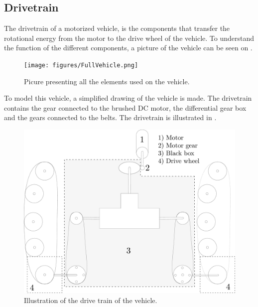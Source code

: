 \subsection{Drivetrain}
The drivetrain of a motorized vehicle, is the components that transfer the rotational energy from the motor to the drive wheel of the vehicle. To understand the function of the different components, a picture of the vehicle can be seen on . 

\begin{figure}[H]
	\centering
	\texttt{[image: figures/FullVehicle.png]}
	\caption{Picure presenting all the elements used on the vehicle.}
	\label{FullVehicle}
\end{figure}

To model this vehicle, a simplified drawing of the vehicle is made. The drivetrain contains the gear connected to the brushed DC motor, the differential gear box and the gears connected to the belts. The drivetrain is illustrated in .

\begin{figure}[H]
	\centering
	\includegraphics[scale=.25]{figures/vehicleDescriptionDriveTrain.pdf}
	\caption{Illustration of the drive train of the vehicle.}
	\label{vehicleDescriptionDriveTrain}
\end{figure}

